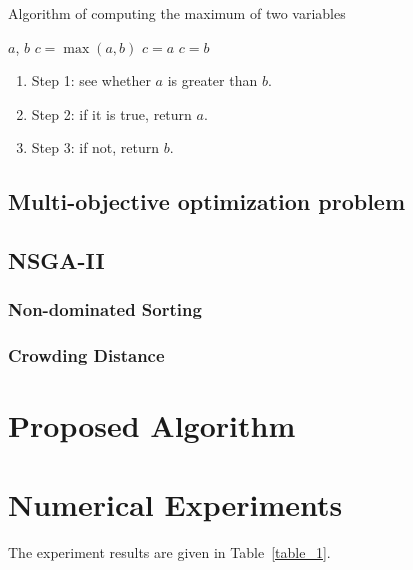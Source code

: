 \documentclass{IEEEtran}
\begin{document}
\begin{algorithm}
	\caption{Algorithm of computing the maximum of two variables}
	\label{alg_1}
	\begin{algorithmic}
		\REQUIRE $a$, $b$
		\ENSURE $c = \max(a,b)$
		\STATE $c=a$
		\ELSE 
		\STATE $c=b$
		\ENDIF 
	\end{algorithmic}
\end{algorithm}




\begin{enumerate}
	\item Step 1: see whether $a$ is greater than $b$.
	\item Step 2: if it is true, return $a$.
	\item Step 3: if not, return $b$.
\end{enumerate}









\subsection{Multi-objective optimization problem}




\subsection{NSGA-II}



\subsubsection{Non-dominated Sorting}

\subsubsection{Crowding Distance}


\section{Proposed Algorithm}

\section{Numerical Experiments}


The experiment results are given in Table~\ref{table_1}.
\end{document}
